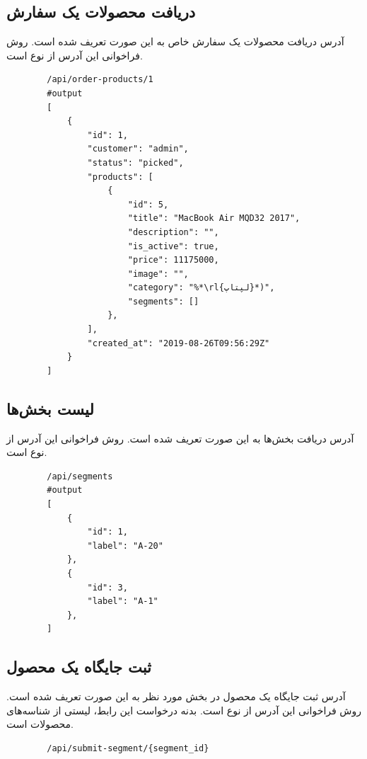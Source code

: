 \subsection{دریافت محصولات یک سفارش}
آدرس دریافت محصولات یک سفارش خاص به این صورت تعریف شده است. روش فراخوانی این آدرس از نوع  است.
\begin{latin}
    \begin{lstlisting}
        /api/order-products/1
        #output
        [
            {
                "id": 1,
                "customer": "admin",
                "status": "picked",
                "products": [
                    {
                        "id": 5,
                        "title": "MacBook Air MQD32 2017",
                        "description": "",
                        "is_active": true,
                        "price": 11175000,
                        "image": "",
                        "category": "%*\rl{لپتاپ}*)",
                        "segments": []
                    },
                ],
                "created_at": "2019-08-26T09:56:29Z"
            }
        ]
    \end{lstlisting}
\end{latin}


\subsection{لیست بخش‌ها}
آدرس دریافت بخش‌ها به این صورت تعریف شده است. روش فراخوانی این آدرس از نوع  است.
\begin{latin}
    \begin{lstlisting}
        /api/segments
        #output
        [
            {
                "id": 1,
                "label": "A-20"
            },
            {
                "id": 3,
                "label": "A-1"
            },
        ]
    \end{lstlisting}
\end{latin}


\subsection{ثبت جایگاه یک محصول}
آدرس ثبت جایگاه یک محصول در بخش مورد نظر به این صورت تعریف شده است. روش فراخوانی این آدرس از نوع  است.
بدنه درخواست این رابط، لیستی از شناسه‌های محصولات است.
\begin{latin}
    \begin{lstlisting}
        /api/submit-segment/{segment_id}
    \end{lstlisting}
\end{latin}

